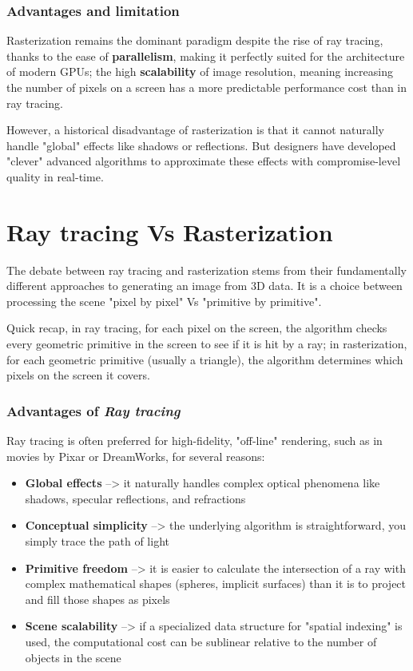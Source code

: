 \subsubsection{Advantages and limitation}
Rasterization remains the dominant paradigm despite the rise of ray tracing, thanks to the ease of \textbf{parallelism}, making it perfectly suited for the architecture of modern GPUs; the high \textbf{scalability} of image resolution, meaning increasing the number of pixels on a screen has a more predictable performance cost than in ray tracing. \par
However, a historical disadvantage of rasterization is that it cannot naturally handle "global" effects like shadows or reflections. But designers have developed "clever" advanced algorithms to approximate these effects with compromise-level quality in real-time.

\section{Ray tracing Vs Rasterization}
The debate between ray tracing and rasterization stems from their fundamentally different approaches to generating an image from 3D data. It is a choice between processing the scene "pixel by pixel" Vs "primitive by primitive".\par
Quick recap, in ray tracing, for each pixel on the screen, the algorithm checks every geometric primitive in the screen to see if it is hit by a ray; in rasterization, for each geometric primitive (usually a triangle), the algorithm determines which pixels on the screen it covers.

\subsubsection{Advantages of \textit{Ray tracing}}
Ray tracing is often preferred for high-fidelity, "off-line" rendering, such as in movies by Pixar or DreamWorks, for several reasons:
\begin{itemize}[noitemsep]
    \item \textbf{Global effects} --> it naturally handles complex optical phenomena like shadows, specular reflections, and refractions
    \item \textbf{Conceptual simplicity }--> the underlying algorithm is straightforward, you simply trace the path of light
    \item \textbf{Primitive freedom} --> it is easier to calculate the intersection of a ray with complex mathematical shapes (spheres, implicit surfaces) than it is to project and fill those shapes as pixels
    \item \textbf{Scene scalability} --> if a specialized data structure for "spatial indexing" is used, the computational cost can be sublinear relative to the number of objects in the scene
\end{itemize}

